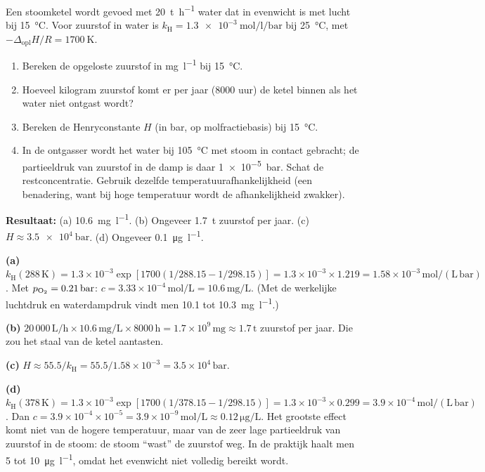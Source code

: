 \begin{oefening}
Een stoomketel wordt gevoed met \SI{20}{\tonne\per\hour} water dat in evenwicht is met lucht bij \SI{15}{\celsius}. Voor zuurstof in water is $k_\mathrm{H} = \SI{1.3e-3}{\mole\per\litre\per\bar}$ bij \SI{25}{\celsius}, met $-\Delta_\mathrm{opl}H/R = \SI{1700}{\kelvin}$.
\begin{enumerate}
\item[(a)] Bereken de opgeloste zuurstof in \si{\milli\gram\per\litre} bij \SI{15}{\celsius}.
\item[(b)] Hoeveel kilogram zuurstof komt er per jaar (8000 uur) de ketel binnen als het water niet ontgast wordt?
\item[(c)] Bereken de Henryconstante $H$ (in \si{\bar}, op molfractiebasis) bij \SI{15}{\celsius}.
\item[(d)] In de ontgasser wordt het water bij \SI{105}{\celsius} met stoom in contact gebracht; de partieeldruk van zuurstof in de damp is daar \SI{1e-5}{\bar}. Schat de restconcentratie. Gebruik dezelfde temperatuurafhankelijkheid (een benadering, want bij hoge temperatuur wordt de afhankelijkheid zwakker).
\end{enumerate}
\end{oefening}
\begin{oplossing}
\textbf{Resultaat:} (a) \SI{10.6}{\milli\gram\per\litre}. (b) Ongeveer \SI{1.7}{\tonne} zuurstof per jaar. (c) $H \approx \SI{3.5e4}{\bar}$. (d) Ongeveer \SI{0.1}{\micro\gram\per\litre}.

\textbf{(a)} $k_\mathrm{H}(288\,\mathrm{K}) = 1.3\times10^{-3}\exp[1700(1/288.15 - 1/298.15)] = 1.3\times10^{-3} \times 1.219 = 1.58\times10^{-3}\,\mathrm{mol/(L\,bar)}$. Met $p_{\ce{O2}} = 0.21\,\mathrm{bar}$: $c = 3.33\times10^{-4}\,\mathrm{mol/L} = 10.6\,\mathrm{mg/L}$. (Met de werkelijke luchtdruk en waterdampdruk vindt men \SI{10.1}{} tot \SI{10.3}{\milli\gram\per\litre}.)

\textbf{(b)} $20\,000\,\mathrm{L/h} \times 10.6\,\mathrm{mg/L} \times 8000\,\mathrm{h} = 1.7\times10^{9}\,\mathrm{mg} \approx 1.7\,\mathrm{t}$ zuurstof per jaar. Die zou het staal van de ketel aantasten.

\textbf{(c)} $H \approx 55.5/k_\mathrm{H} = 55.5/1.58\times10^{-3} = 3.5\times10^{4}\,\mathrm{bar}$.

\textbf{(d)} $k_\mathrm{H}(378\,\mathrm{K}) = 1.3\times10^{-3}\exp[1700(1/378.15 - 1/298.15)] = 1.3\times10^{-3}\times 0.299 = 3.9\times10^{-4}\,\mathrm{mol/(L\,bar)}$. Dan $c = 3.9\times10^{-4}\times10^{-5} = 3.9\times10^{-9}\,\mathrm{mol/L} \approx 0.12\,\mathrm{\mu g/L}$. Het grootste effect komt niet van de hogere temperatuur, maar van de zeer lage partieeldruk van zuurstof in de stoom: de stoom ``wast'' de zuurstof weg. In de praktijk haalt men 5 tot \SI{10}{\micro\gram\per\litre}, omdat het evenwicht niet volledig bereikt wordt.
\end{oplossing}

